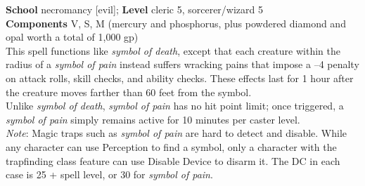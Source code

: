\textbf{School} necromancy [evil]; \textbf{Level} cleric 5, sorcerer/wizard 5\\
\textbf{Components} V, S, M (mercury and phosphorus, plus powdered diamond and opal worth a total of 1,000 gp)\\
This spell functions like \textit{symbol of death}, except that each creature within the radius of a \textit{symbol of pain }instead suffers wracking pains that impose a --4 penalty on attack rolls, skill checks, and ability checks. These effects last for 1 hour after the creature moves farther than 60 feet from the symbol.\\
Unlike \textit{symbol of death}, \textit{symbol of pain }has no hit point limit; once triggered, a \textit{symbol of pain }simply remains active for 10 minutes per caster level.\\
\textit{Note}: Magic traps such as \textit{symbol of pain }are hard to detect and disable. While any character can use Perception to find a symbol, only a character with the trapfinding class feature can use Disable Device to disarm it. The DC in each case is 25 + spell level, or 30 for \textit{symbol of pain}.\\
